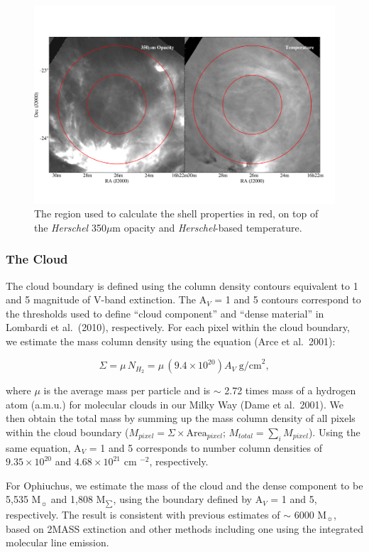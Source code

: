 \documentclass[11pt,a4paper]{emulateapj}
\begin{document}
\begin{figure}[ht]
\centering
\includegraphics[scale=0.3]{fig/shell_herschel_circles.png}
\caption{The region used to calculate the shell properties in red, on top of the {\it Herschel} 350$\mu$m opacity and {\it Herschel}-based temperature.
}
\end{figure}

\subsubsection{The Cloud}
The cloud boundary is defined using the column density contours equivalent to 1 and 5 magnitude of V-band extinction. The A$_V$ = 1 and 5 contours correspond to the thresholds used to define ``cloud component'' and ``dense material'' in Lombardi et al.\ (2010), respectively. For each pixel within the cloud boundary, we estimate the mass column density using the equation (Arce et al.\ 2001):

\begin{equation}
\Sigma = \mu\,N_{H_2} = \mu\,(9.4\times10^{20})A_V\;\text{g/cm}^2,
\end{equation}

where $\mu$ is the average mass per particle and is $\sim$ 2.72 times mass of a hydrogen atom (a.m.u.) for molecular clouds in our Milky Way (Dame et al.\ 2001). We then obtain the total mass by summing up the mass column density of all pixels within the cloud boundary ($M_{pixel} = \Sigma\times \text{Area}_{pixel}$; $M_{total} = \sum_{i}M_{pixel}$). Using the same equation, A$_V$ = 1 and 5 corresponds to number column densities of $9.35 \times 10^{20}$ and $4.68 \times 10^{21}$ cm $^{-2}$, respectively.

For Ophiuchus, we estimate the mass of the cloud and the dense component to be 5,535 M$_{\sun}$ and 1,808 M$_{\sum}$, using the boundary defined by A$_V$ = 1 and 5, respectively. The result is consistent with previous estimates of $\sim$ 6000 M$_{\sun}$, based on 2MASS extinction and other methods including one using the integrated molecular line emission.
\end{document}
